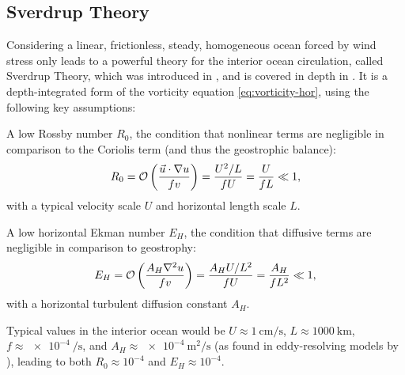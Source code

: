 \subsection{Sverdrup Theory}
\label{sec:sverdrup}
Considering a linear, frictionless, steady, homogeneous ocean forced by wind stress only leads to a powerful theory for the interior ocean circulation, called Sverdrup Theory, which was introduced in \cite{sverdrup}, and is covered in depth in \cite{pedloskyoct}. It is a depth-integrated form of the vorticity equation \eqref{eq:vorticity-hor}, using the following key assumptions:

\begin{items}
	\item A low Rossby number \(R_0\), \ie the condition that nonlinear terms are negligible in comparison to the Coriolis term (and thus the geostrophic balance):
	\begin{equation}
	R_0 = \mathcal{O}\left(\frac{\vec{u}\cdot\nabla u}{fv}\right) = \frac{U^2/L}{fU} = \frac{U}{fL} \ll 1,
	\end{equation}
	with a typical velocity scale \(U\) and horizontal length scale \(L\).
	\item A low horizontal Ekman number \(E_H\), \ie the condition that diffusive terms are negligible in comparison to geostrophy:
	\begin{equation} E_H = \mathcal{O}\left(\frac{A_H \nabla^2 u}{fv}\right) = \frac{A_H U/L^2}{fU} = \frac{A_H}{fL^2} \ll 1, \end{equation}
	with a horizontal turbulent diffusion constant \(A_H\).
\end{items}
%
Typical values in the interior ocean would be \(U \approx \SI{1}{\cm\per\second}\), \(L \approx \SI{1000}{\kilo\metre}\), \(f \approx \SI{e-4}{\per\second}\), and \(A_H \approx \SI{e-4}{\square\metre\per\second}\) (as found in eddy-resolving models \eg by \cite{bryan}), leading to both \(R_0 \approx 10^{-4}\) and \(E_H \approx 10^{-4}\).

